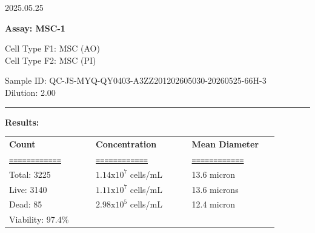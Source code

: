 \documentclass[UTF8,10pt,a4paper,fontset=fandol]{ctexart}
\newcommand{\fieldvalue}[1]{#1}
\newcommand{\handwritten}[1]{#1}
\begin{document}
\fieldvalue{\handwritten{2025.05.25}}

\newpage

\textbf{Assay: MSC-1}

\vspace{0.5em}

Cell Type F1: MSC (AO)\\
Cell Type F2: MSC (PI)

\vspace{0.5em}

Sample ID: QC-JS-MYQ-QY0403-A3ZZ201202605030-20260525-66H-3\\
Dilution: 2.00

\noindent\rule{\linewidth}{0.4pt}

\textbf{Results:}

\vspace{0.5em}

\begin{tabular}{@{}p{0.29\linewidth}p{0.31\linewidth}p{0.29\linewidth}@{}}
\textbf{Count} & \textbf{Concentration} & \textbf{Mean Diameter} \\
\underline{\texttt{============}} &
\underline{\texttt{============}} &
\underline{\texttt{============}} \\[0.2em]
Total: 3225 & $1.14\mathrm{x}10^{7}$ cells/mL & 13.6 micron \\
Live: 3140 & $1.11\mathrm{x}10^{7}$ cells/mL & 13.6 microns \\
Dead: 85 & $2.98\mathrm{x}10^{5}$ cells/mL & 12.4 micron \\
Viability: 97.4\% & & \\
\end{tabular}

\vspace{1em}

\begin{center}
\fbox{\rule{0pt}{0.20\textheight}\rule{0.43\linewidth}{0pt}}
\hspace{0.03\linewidth}
\fbox{\rule{0pt}{0.20\textheight}\rule{0.43\linewidth}{0pt}}

\vspace{1em}

\fbox{\rule{0pt}{0.20\textheight}\rule{0.43\linewidth}{0pt}}
\hspace{0.03\linewidth}
\fbox{\rule{0pt}{0.20\textheight}\rule{0.43\linewidth}{0pt}}
\end{center}
\end{document}
